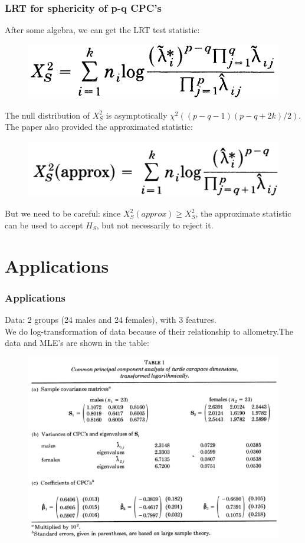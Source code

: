 \documentclass{beamer}
\begin{document}
\begin{frame}
	\frametitle{LRT for sphericity of p-q CPC's}
	After some algebra, we can get the LRT test statistic:
	\begin{figure}
		\includegraphics[width=.4\linewidth]{image017.png}
	\end{figure}
	The null distribution of $X_S^2$ is asymptotically $\chi^2((p-q-1)(p-q+2k)/2)$.
	The paper also provided the approximated statistic:
	\begin{figure}
		\includegraphics[width=.4\linewidth]{image018.png}
	\end{figure}
	But we need to be careful: since $X_S^2(approx)\geq X_S^2$, the approximate statistic can be used to accept $H_S$, but not necessarily to reject it.
\end{frame}


\section{Applications}
\begin{frame}
	\frametitle{Applications}
	Data: 2 groups (24 males and 24 females), with 3 features.\\
	We do log-transformation of data because of their relationship to allometry.The data and MLE's are shown in the table:
	\begin{figure}
		\includegraphics[width=.8\linewidth]{image019.png}
	\end{figure}
\end{frame}
\end{document}
